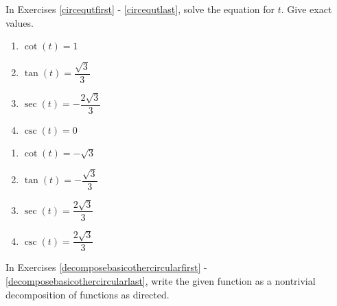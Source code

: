 \documentclass{ximera}
\begin{document}
In Exercises \ref{circequtfirst} - \ref{circequtlast}, solve the equation for $t$.  Give exact values.

\begin{multicols}{4}

\begin{enumerate}

\setcounter{enumi}{\value{HW}}

\item $\cot(t) = 1$  \label{circequtfirst}
\item  $\tan(t) = \dfrac{\sqrt{3}}{3}$ 
\item $\sec(t) = -\dfrac{2\sqrt{3}}{3}$
\item $\csc(t) = 0$  

\setcounter{HW}{\value{enumi}}

\end{enumerate}

\end{multicols}

\begin{multicols}{4}

\begin{enumerate}

\setcounter{enumi}{\value{HW}}

\item $\cot(t) = -\sqrt{3}$  
\item $\tan(t) = -\dfrac{\sqrt{3}}{3}$
\item $\sec(t) = \dfrac{2\sqrt{3}}{3}$
\item $\csc(t) = \dfrac{2\sqrt{3}}{3}$ \label{circequtlast}

\setcounter{HW}{\value{enumi}}

\end{enumerate}

\end{multicols}

In Exercises \ref{decomposebasicothercircularfirst} - \ref{decomposebasicothercircularlast}, write the given function as a nontrivial decomposition of functions as directed.
\end{document}
